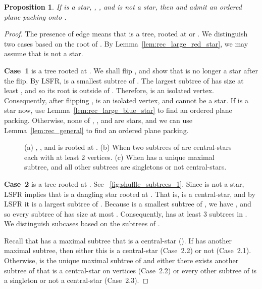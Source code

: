 \documentclass[11pt,a4paper,colorlinks=true,urlcolor=blue,citecolor=red]{article}
\theoremstyle{plain}
\newtheorem{proposition}[theorem]{Proposition}
\newcommand{\case}[1]{\par\vspace{.5\baselineskip}\noindent\textbf{\sffamily Case~#1}}
\begin{document}
\begin{proposition}\label{prop:rec_small_blue_star_equal_ij_used_no_red_star}
  If  is a star, ,
  , and  is not a star, then  and 
  admit an ordered plane packing onto .
\end{proposition}
\begin{proof}
  The presence of edge  means that  is a tree, rooted
  at  or . We distinguish two cases based on the root of . By
  Lemma~\ref{lem:rec_large_red_star}, we may assume that  is not a star.

  \case{1}  is a tree rooted at . We shall flip , and show that
   is no longer a star after the flip. By LSFR, 
  is a smallest subtree of . The largest subtree of  has size at
  least , and so its root is outside of .
  Therefore,  is an isolated vertex.
  Consequently, after flipping ,  is
  an isolated vertex, and  cannot be a star. If
   is a star now, use Lemma~\ref{lem:rec_large_blue_star} to
  find an ordered plane packing. Otherwise, none of , ,
   and  are stars, and we can use
  Lemma~\ref{lem:rec_general} to find an ordered plane packing.

  \begin{figure}[htbp]
    \centering\hfil {}\hfil {}\hfil {}\hfil \caption{(a) , , and  is rooted at .
      (b) When two subtrees of  are central-stars each with at least 2 vertices.
      (c) When  has a unique maximal subtree, and all other subtrees are singletons or not central-stars.
}
    \label{fig:shuffle_subtrees}
  \end{figure}

  \case{2}  is a tree rooted at . See
  \figurename~\ref{fig:shuffle_subtrees_1}. Since  is not a star,
  LSFR implies that  is a dangling star rooted at . That is,
   is a central-star, and by LSFR it is a largest
  subtree of . Because  is a smallest subtree of , we have
  , and so every subtree of  has size at most
  . Consequently,  has at least 3 subtrees in
  . We distinguish subcases based on the subtrees of .

  Recall that  has a maximal subtree that is a central-star
  (). If  has another maximal subtree, then either
  this is a central-star (Case~2.2) or not (Case~2.1). Otherwise,
   is the unique maximal subtree of  and either there
  exists another subtree of  that is a central-star on 
  vertices (Case~2.2) or every other subtree of  is a singleton or
  not a central-star (Case~2.3).


\end{proof}
\end{document}
